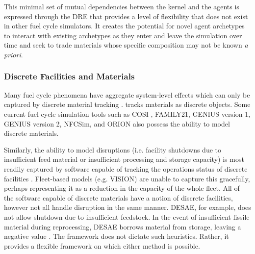 This minimal set of mutual dependencies between the kernel and the agents is
expressed through the \gls{DRE} that provides a level of flexibility that does
not exist in other fuel cycle simulators.  It creates the potential for novel
agent archetypes to interact with existing archetypes as they enter and leave
the simulation over time and seek to trade materials whose specific
composition may not be known \textit{a priori}.

\subsubsection{Discrete Facilities and Materials}

Many fuel cycle phenomena have aggregate system-level effects which can only be
captured by discrete material tracking \cite{huff_next_2010}.  \Cyclus
tracks materials as discrete objects. Some current fuel cycle simulation tools
such as \gls{COSI}
\cite{mccarthy_benchmark_2012,grasso_nea-wpfc/fcts_2009,guerin_benchmark_2009},
FAMILY21\cite{mccarthy_benchmark_2012},
\gls{GENIUS} version 1, \gls{GENIUS} version 2, \gls{NFCSim}, and ORION also 
possess the ability to model discrete materials.

Similarly, the ability to model disruptions (i.e. facility shutdowns due to
insufficient feed material or insufficient processing and storage capacity) is
most readily captured by software capable of tracking the operations status of
discrete facilities \cite{huff_next_2010}.  Fleet-based models (e.g.
\gls{VISION}) are unable to capture this gracefully, perhaps representing it as
a reduction in the capacity of the whole fleet.  All of the software
capable of discrete materials have a notion of discrete facilities, however not
all handle disruption in the same manner. \gls{DESAE}, for example, does not
allow shutdown due to insufficient feedstock. In the event
of insufficient fissile material during reprocessing, \gls{DESAE} borrows
material from storage, leaving a negative value \cite{mccarthy_benchmark_2012}.
The \Cyclus framework does not dictate such heuristics. Rather, it provides a
flexible framework on which either method is possible.
